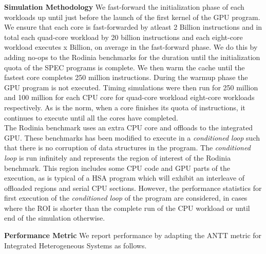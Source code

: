 \textbf{Simulation Methodology} We fast-forward the initialization phase of each workloads up until just before the launch of the first kernel of the GPU program. We ensure that each core is fast-forwarded by atleast 2 Billion instructions and in total each quad-core workload by 20 billion instructions and each eight-core workload executes x Billion, on average in the fast-forward phase. We do this by adding no-ops to the Rodinia benchmarks for the duration until the initialization quota of the SPEC programs is complete. We then warm the cache until the fastest core completes 250 million instructions. During the warmup phase the GPU program is not executed. Timing simulations were then run for 250 million and 100 million for each CPU core for quad-core workload eight-core workloads respectively. As is the norm, when a core finishes its quota of instructions, it continues to execute until all the cores have completed. \\
The Rodinia benchmark uses an extra CPU core and offloads to the integrated GPU. These benchmarks has been modified to execute in a \textit{conditioned loop} such that there is no corruption of data structures in the program. The \textit{conditioned loop} is run infinitely and represents the region of interest of the Rodinia benchmark. This region includes some CPU code and GPU parts of the execution, as is typical of a HSA program which will exhibit an interleave of offloaded regions and serial CPU sections. However, the performance statistics for first execution of the \textit{conditioned loop} of the program are considered, in cases where the ROI is shorter than the complete run of the CPU workload or until end of the simulation otherwise. 

\textbf{Performance Metric} We report performance by adapting the ANTT \cite{antt} metric for Integrated Heterogeneous Systems as follows. 

